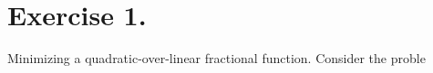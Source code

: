 \section*{Exercise 1.}

Minimizing a quadratic-over-linear fractional function. Consider the proble 